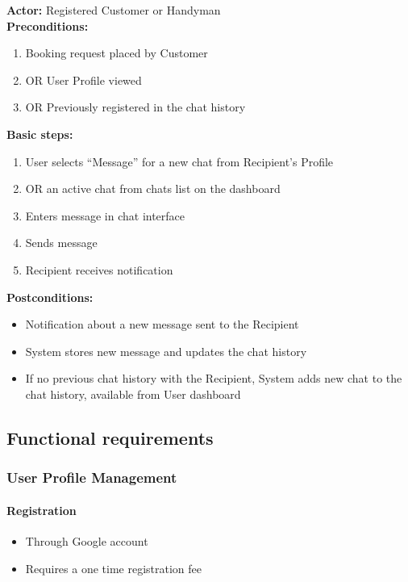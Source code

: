 \documentclass[11pt,a4paper]{article}
\begin{document}
\textbf{Actor:} Registered Customer or Handyman \\
\textbf{Preconditions:}
\begin{enumerate}
\item Booking request placed by Customer
\item OR User Profile viewed
\item OR Previously registered in the chat history
\end{enumerate}
\textbf{Basic steps:}
\begin{enumerate}
\item User selects ``Message'' for a new chat from Recipient's Profile
\item OR an active chat from chats list on the dashboard
\item Enters message in chat interface
\item Sends message
\item Recipient receives notification
\end{enumerate}
\textbf{Postconditions:}
\begin{itemize}
\item Notification about a new message sent to the Recipient
\item System stores new message and updates the chat history
\item If no previous chat history with the Recipient, System adds new chat to the chat history, available from User dashboard
\end{itemize}


\subsection{Functional requirements}

\subsubsection{User Profile Management}

\paragraph{Registration}

\begin{itemize}
\item Through Google account
\item Requires a one time registration fee
\end{itemize}
\end{document}
